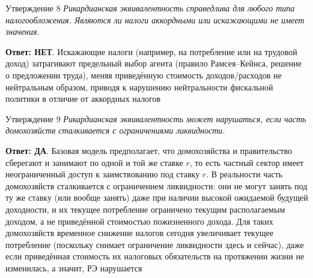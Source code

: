 \documentclass[10pt,a4paper]{article}
\newcommand{\qda}{\textbf{\color{yesgreen}Ответ: ДА}}
\newcommand{\qnet}{\textbf{\color{nored}Ответ: НЕТ}}
\newenvironment{answer}[2]{%
  \begin{qbox}{Утверждение #1}
  \textit{#2}\par\smallskip
}{%
  \end{qbox}\vspace{2pt}
}
\begin{document}
\begin{answer}{8}{Рикардианская эквивалентность справедлива для любого типа налогообложения. Являются ли налоги аккордными или искажающими не имеет значения.}
\qnet. Искажающие налоги (например, на потребление или на трудовой доход) затрагивают предельный выбор агента (правило Рамсея–Кейнса, решение о предложении труда), меняя приведённую стоимость доходов/расходов не нейтральным образом, приводя к нарушению нейтральности фискальной политики в отличие от аккордных налогов
\end{answer}

\begin{answer}{9}{Рикардианская эквивалентность может нарушаться, если часть домохозяйств сталкивается с ограничениями ликвидности.}
\qda. Базовая модель предполагает, что домохозяйства и правительство сберегают и занимают по одной и той же ставке $r$, то есть частный сектор имеет неограниченный доступ к заимствованию под ставку $r$. В реальности часть домохозяйств сталкивается с ограничением ликвидности: они не могут занять под ту же ставку (или вообще занять) даже при наличии высокой ожидаемой будущей доходности, и их текущее потребление ограничено текущим располагаемым доходом, а не приведённой стоимостью пожизненного дохода. Для таких домохозяйств временное снижение налогов сегодня увеличивает текущее потребление (поскольку снимает ограничение ликвидности здесь и сейчас), даже если приведённая стоимость их налоговых обязательств на протяжении жизни не изменилась, а значит, РЭ нарушается
\end{answer}
\end{document}
